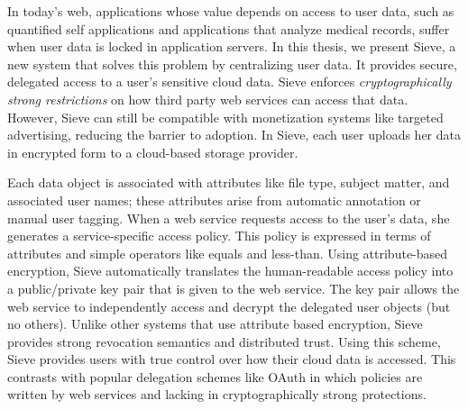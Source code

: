 % 
% 
%
In today's web, applications whose
value depends on access to user
data, such as quantified self applications
and applications that analyze medical
records, suffer when user data is 
locked in application servers.
In this thesis, we present Sieve,
a new system that solves
this problem by centralizing
user data. It provides
secure, delegated access to a user's
sensitive cloud data. Sieve enforces
\emph{cryptographically strong
restrictions} on how third party
web services can access that data.
However, Sieve can still be compatible
with monetization systems like targeted
advertising, reducing the barrier to
adoption. In Sieve, each user uploads
her data in encrypted form to a
cloud-based storage provider. 

Each data object is associated with
attributes like file type, subject
matter, and associated user names;
these attributes arise from automatic
annotation or manual user tagging.
When a web service requests access
to the user's data, she generates
a service-specific access policy.
This policy is expressed in terms of
attributes and simple operators like
equals and less-than. Using attribute-based
encryption, Sieve automatically translates
the human-readable access policy into a
public/private key pair that is given
to the web service. The key pair allows
the web service to independently access
and decrypt the delegated user objects
(but no others). Unlike other systems
that use attribute based encryption,
Sieve provides strong revocation semantics
and distributed trust. Using this scheme,
Sieve provides users with true control
over how their cloud data is accessed.
This contrasts with popular delegation
schemes like OAuth in which policies
are written by web services and lacking
in cryptographically strong protections.
